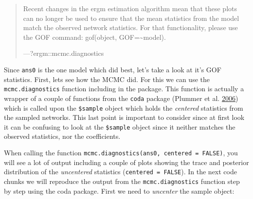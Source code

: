 \documentclass[]{book}
\newenvironment{Shaded}{\begin{snugshade}}{\end{snugshade}}
\newcommand{\CommentTok}[1]{\textcolor[rgb]{0.56,0.35,0.01}{\textit{#1}}}
\newcommand{\ControlFlowTok}[1]{\textcolor[rgb]{0.13,0.29,0.53}{\textbf{#1}}}
\newcommand{\DataTypeTok}[1]{\textcolor[rgb]{0.13,0.29,0.53}{#1}}
\newcommand{\DecValTok}[1]{\textcolor[rgb]{0.00,0.00,0.81}{#1}}
\newcommand{\KeywordTok}[1]{\textcolor[rgb]{0.13,0.29,0.53}{\textbf{#1}}}
\newcommand{\NormalTok}[1]{#1}
\newcommand{\OperatorTok}[1]{\textcolor[rgb]{0.81,0.36,0.00}{\textbf{#1}}}
\newcommand{\OtherTok}[1]{\textcolor[rgb]{0.56,0.35,0.01}{#1}}
\newcommand{\StringTok}[1]{\textcolor[rgb]{0.31,0.60,0.02}{#1}}
\begin{document}
\begin{quote}
Recent changes in the ergm estimation algorithm mean that these plots can no longer be used to ensure that the mean statistics from the model match the observed network statistics. For that functionality, please use the GOF command: gof(object, GOF=\textasciitilde{}model).

---?ergm::mcmc.diagnostics
\end{quote}

Since \texttt{ans0} is the one model which did best, let's take a look at it's GOF statistics. First, lets see how the MCMC did. For this we can use the \texttt{mcmc.diagnostics} function including in the package. This function is actually a wrapper of a couple of functions from the \texttt{coda} package (Plummer et al. \protect\hyperlink{ref-R-coda}{2006}) which is called upon the \texttt{\$sample} object which holds the \emph{centered} statistics from the sampled networks. This last point is important to consider since at first look it can be confusing to look at the \texttt{\$sample} object since it neither matches the observed statistics, nor the coefficients.

When calling the function \texttt{mcmc.diagnostics(ans0,\ centered\ =\ FALSE)}, you will see a lot of output including a couple of plots showing the trace and posterior distribution of the \emph{uncentered} statistics (\texttt{centered\ =\ FALSE}). In the next code chunks we will reproduce the output from the \texttt{mcmc.diagnostics} function step by step using the coda package. First we need to \emph{uncenter} the sample object:

\begin{Shaded}
\end{Shaded}
\end{document}
